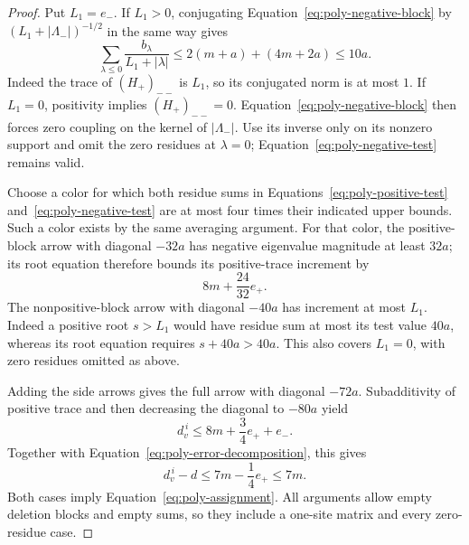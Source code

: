 \begin{proof}
Put \(L_1=e_-\).  If \(L_1>0\), conjugating
Equation~\eqref{eq:poly-negative-block} by
\((L_1+|\Lambda_-|)^{-1/2}\) in the same way gives
\begin{equation}
 \sum_{\lambda\leq0}\frac{b_\lambda}{L_1+|\lambda|}
              \leq2(m+a)+(4m+2a)\leq10a.
 \label{eq:poly-negative-test}
\end{equation}
Indeed the trace of \((H_+)_{--}\) is \(L_1\), so its conjugated norm
is at most \(1\).  If \(L_1=0\), positivity implies
\((H_+)_{--}=0\).  Equation~\eqref{eq:poly-negative-block} then forces
zero coupling on the kernel of \(|\Lambda_-|\).  Use its inverse only
on its nonzero support and omit the zero residues at \(\lambda=0\);
Equation~\eqref{eq:poly-negative-test} remains valid.

Choose a color for which both residue sums in
Equations~\eqref{eq:poly-positive-test}
and~\eqref{eq:poly-negative-test} are at most four times their indicated
upper bounds.  Such a color exists by the same averaging argument.
For that color, the positive-block arrow with diagonal \(-32a\) has
negative eigenvalue magnitude at least \(32a\); its root equation
therefore bounds its positive-trace increment by
\[
                              8m+\frac{24}{32}e_+.
\]
The nonpositive-block arrow with diagonal \(-40a\) has increment at
most \(L_1\).  Indeed a positive root \(s>L_1\) would have residue sum
at most its test value \(40a\), whereas its root equation requires
\(s+40a>40a\).  This also covers \(L_1=0\), with zero residues omitted
as above.

Adding the side arrows gives the full arrow with diagonal \(-72a\).
Subadditivity of positive trace and then decreasing the diagonal to
\(-80a\) yield
\[
                 d_v^{\,i}\leq8m+\frac34e_++e_-.
\]
Together with Equation~\eqref{eq:poly-error-decomposition}, this gives
\[
                      d_v^{\,i}-d\leq7m-\frac14e_+\leq7m.
\]
Both cases imply Equation~\eqref{eq:poly-assignment}.  All arguments
allow empty deletion blocks and empty sums, so they include a
one-site matrix and every zero-residue case.
\end{proof}
